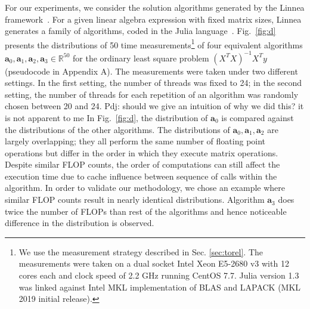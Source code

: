 \documentclass[conference]{IEEEtran}
\newcommand{\p}[1]{{\color{blue} Pdj: #1}}
\begin{document}
For our experiments, we consider the solution algorithms generated by the Linnea
framework~\cite{barthels2019linnea}. For a given linear algebra expression with fixed matrix sizes, Linnea generates a
family of algorithms, coded in the Julia language~\cite{julia}.  Fig.~\ref{fig:d} presents the distributions of 50 time measurements\footnote{We
  use the measurement strategy described in Sec. \ref{sec:torel}. The measurements were taken on a dual  socket Intel
  Xeon E5-2680 v3 with 12 cores each and clock speed of 2.2 GHz running CentOS 7.7. Julia version 1.3 was linked against
  Intel MKL implementation of BLAS and LAPACK (MKL 2019 initial release).} of four equivalent algorithms $\mathbf{a}_0,
\mathbf{a}_1, \mathbf{a}_2, \mathbf{a}_3 \in \mathbb{R}^{50}$ for the ordinary least square problem  $(X^TX)^{-1}X^{T}y$
(pseudocode in Appendix A). The measurements were taken under two different settings. In the first setting, the number
of threads was fixed to 24; in the second setting, the number of threads for each repetition of an algorithm was
randomly chosen between 20 and 24. \p{should we give an intuition of why we did this? it is not apparent to me} In
Fig.~\ref{fig:d}, the distribution of $\mathbf{a}_0$ is compared against the distributions of the other algorithms.  The
distributions of $\mathbf{a}_0, \mathbf{a}_1, \mathbf{a}_2$ are largely overlapping; they all perform the same number of
floating point operations but differ in the order in which they execute matrix operations. Despite similar FLOP counts,
the order of computations can still affect the execution time due to cache influence between sequence of calls within
the algorithm\cite{peise2014cache}. In order to validate our methodology, we chose an example where similar FLOP counts
result in nearly identical distributions.
Algorithm $\mathbf{a}_3$ does twice the number of FLOPs than rest of the algorithms and hence noticeable difference in the distribution is observed.
\end{document}
